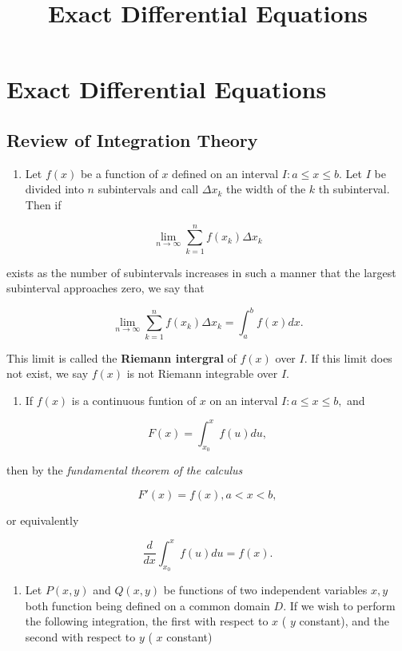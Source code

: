 \documentclass{article}
\title{Exact Differential Equations}
\begin{document}
\section{Exact Differential Equations}

\subsection{Review of Integration Theory}

\begin{enumerate}
\item Let $f(x)$ be a function of $x$ defined on an \@{interval} $I: a \leq x \leq b$. Let $I$ be divided into $n$ subintervals and call $\Delta x_k$ the width of the $k$ th subinterval. Then if
\end{enumerate}

\[ \tag{9.11} \lim_{n \to \infty} \sum\limits_{k=1}^n f(x_k) \Delta x_k \]

exists as the number of subintervals increases in such a manner that the largest subinterval approaches zero, we say that

\[ \tag{9.12} \lim_{n \to \infty} \sum\limits_{k=1}^n f(x_k) \Delta x_k = \int_{a}^{b} f(x)dx. \]

This limit is called the \textbf{Riemann intergral} of $f(x)$ over $I$. If this limit does not exist, we say $f(x)$ is not Riemann integrable over $I$.

\begin{enumerate}
\item If $f(x)$ is a \@{continuous} funtion of $x$ on an \@{interval} $I: a \leq x \leq b,$ and
\end{enumerate}

\[ \tag{9.13} F(x) = \int_{x_0}^{x} f(u)du, \]

then by the \emph{fundamental theorem of the calculus}

\[ \tag{9.14} F'(x) = f(x), a < x < b, \]

or equivalently

\[ \tag{9.15} \frac{d}{dx}\int_{x_0}^x f(u)du = f(x). \]

\begin{enumerate}
\item Let $P(x,y)$ and $Q(x,y)$ be functions of two independent variables $x,y$ both function being defined on a common domain $D$. If we wish to perform the following integration, the first with respect to $x$ ( $y$ constant), and the second with respect to $y$ ( $x$ constant)
\end{enumerate}
\end{document}
